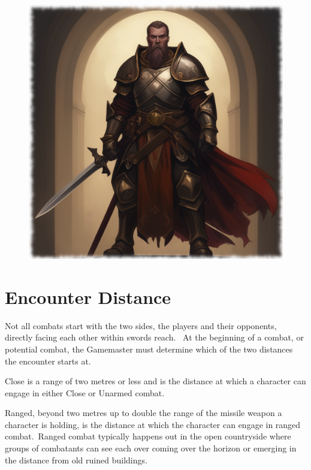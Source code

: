 \begin{figure}[H]
\begin{center}
\includegraphics[scale=0.24]{img/ai-images/knight.png}
\end{center}
\end{figure}

\section{Encounter Distance}
Not all combats start with the two sides, the players and their opponents, directly facing each other within swords reach.  At the beginning of a combat, or potential combat, the Gamemaster must determine which of the two distances the encounter starts at.

Close is a range of two metres or less and is the distance at which a character can engage in either Close or Unarmed combat. 

Ranged, beyond two metres up to double the range of the missile weapon a character is holding, is the distance at which the character can engage in ranged combat. Ranged combat typically happens out in the open countryside where groups of combatants can see each over coming over the horizon or emerging in the distance from old ruined buildings.



